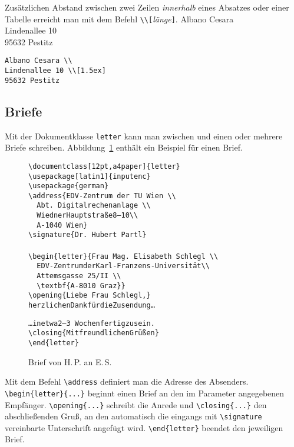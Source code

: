 Zusätzlichen Abstand zwischen zwei Zeilen \emph{innerhalb}
eines Absatzes oder einer Tabelle erreicht man mit dem Befehl
\verb|\\[|\textit{länge}\verb|]|.
\exa
Albano Cesara \\
Lindenallee 10 \\[1.5ex]
95632 Pestitz
\exb
\begin{verbatim}
Albano Cesara \\
Lindenallee 10 \\[1.5ex]
95632 Pestitz
\end{verbatim}
\exc

\smallskip
 
 
\subsection{Briefe}\label{briefe}
 
Mit der Dokumentklasse \texttt{letter} kann man zwischen
\verb|| und \verb|| einen oder
mehrere Briefe schreiben. 
Abbildung~\ref{brief} enthält ein Beispiel für einen Brief.

\begin{figure}[ht] %
\oben{11cm}
\begin{alltt}
\verb+\documentclass[12pt,a4paper]{letter}+
\verb+\usepackage[latin1]{inputenc}+
\verb+\usepackage{german}+
\verb+\address{EDV-Zentrum der TU Wien \\+
\verb+  Abt. Digitalrechenanlage \\+
\verb+  +Wiedner Hauptstra\ss{}e 8--10 \verb+\\+
\verb+  A-1040 Wien}+
\verb+\signature{Dr. Hubert Partl}+
\verb++
\verb+\begin{letter}{Frau Mag. Elisabeth Schlegl \\+
\verb+  +EDV-Zentrum der Karl-Franzens-Universit\"at \verb+\\+
\verb+  Attemsgasse 25/II \\+
\verb+  \textbf{A-8010 Graz}}+
\verb+\opening{Liebe Frau Schlegl,}+
herzlichen Dank f\"ur die Zusendung \dots

\dots in etwa 2--3~Wochen fertig zu sein.
\verb+\closing{+Mit freundlichen Gr\"u\ss{}en\verb+}+
\verb+\end{letter}+
\verb++
\end{alltt}
\unten
\caption{Brief von H.\,P. an E.\,S.} \label{brief}
\end{figure}

Mit dem Befehl \verb|\address| definiert man die Adresse des Absenders.
\verb|\begin{letter}{...}| beginnt einen Brief an den im
Parameter angegebenen Empfänger.
\verb|\opening{...}| schreibt die Anrede 
und \verb|\closing{...}| den abschließenden Gruß, 
an den automatisch die eingangs mit
\verb|\signature| vereinbarte Unterschrift angefügt wird.
\verb|\end{letter}| beendet den jeweiligen Brief.

